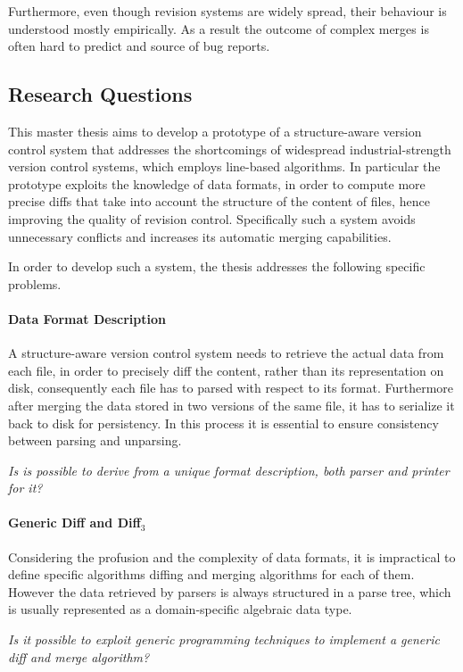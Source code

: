 \documentclass[../Thesis.tex]{subfiles}
\begin{document}
	Furthermore, even though revision systems are widely spread, their
	behaviour is understood mostly empirically.
	As a result the outcome of complex merges is often hard to predict
	and source of bug reports.

\subsection{Research Questions}
This master thesis aims to develop a prototype of a structure-aware
version control system that addresses the shortcomings of widespread 
industrial-strength version control systems, which employs 
line-based algorithms.
In particular the prototype exploits the knowledge of data formats,
in order to compute more precise diffs that take into account the structure 
of the content of files, hence improving the quality of revision control.
Specifically such a system avoids unnecessary conflicts and increases
its automatic merging capabilities. 

In order to develop such a system, the thesis addresses the following specific problems.

\paragraph{Data Format Description}
A structure-aware version control system needs to retrieve the 
actual data from each file, in order to precisely diff the content, rather
than its representation on disk, consequently each file has to parsed
 with respect to its format. Furthermore after merging the data stored in two
versions of the same file, it has to serialize it back to disk for persistency.
In this process it is essential to ensure consistency between parsing
and unparsing.

\emph{Is is possible to derive from a unique format description, both 
parser and printer for it?}

\paragraph{Generic Diff and Diff$_3$}
Considering the profusion and the complexity of data formats, it is impractical
to define specific algorithms diffing and merging algorithms for each of them.
However the data retrieved by parsers is always structured in a parse tree,
which is usually represented as a domain-specific algebraic data type.

\emph{Is it possible to exploit generic programming techniques
to implement a generic diff and merge algorithm?}
\end{document}
